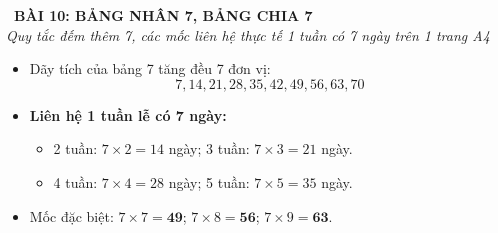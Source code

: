 \documentclass[12pt,a4paper]{article}
\begin{document}
\begin{tcolorbox}[
  enhanced,
  colback=teal!8!white,
  colframe=teal!70!black,
  arc=3mm, boxrule=1.2pt,
  left=3mm, right=3mm, top=2mm, bottom=2mm,
  halign=center
]
  {\LARGE\bfseries\color{teal!90!black}\faBookmark\ BÀI 10: BẢNG NHÂN 7, BẢNG CHIA 7}\\[1mm]
  {\itshape\footnotesize\color{black!75} Quy tắc đếm thêm 7, các mốc liên hệ thực tế 1 tuần có 7 ngày trên 1 trang A4}
\end{tcolorbox}

\vspace{-2mm}

\noindent
\begin{minipage}[t]{0.49\textwidth}\vspace{0pt}
\begin{tcolorbox}[
  enhanced,
  colback=blue!4!white,
  colframe=blue!75!black,
  arc=2mm, boxrule=0.8pt,
  left=2mm, right=2mm, top=1.8mm, bottom=1.8mm,
  title={\footnotesize\bfseries\color{white}\faTimes\ 1. Bảng nhân 7 (Đếm thêm 7)}
]
{\footnotesize
\begin{itemize}\setlength{\itemsep}{0.6pt}\setlength{\leftskip}{-2.5mm}
  \item Dãy tích của bảng 7 tăng đều 7 đơn vị:
  $$7, 14, 21, 28, 35, 42, 49, 56, 63, 70$$
  \item \textbf{Liên hệ 1 tuần lễ có 7 ngày:}
  \begin{itemize}\setlength{\itemsep}{0.5pt}\setlength{\leftskip}{-2.5mm}
    \item 2 tuần: $7 \times 2 = 14$ ngày; 3 tuần: $7 \times 3 = 21$ ngày.
    \item 4 tuần: $7 \times 4 = 28$ ngày; 5 tuần: $7 \times 5 = 35$ ngày.
  \end{itemize}
  \item Mốc đặc biệt: $7 \times 7 = \mathbf{49}$; $7 \times 8 = \mathbf{56}$; $7 \times 9 = \mathbf{63}$.
\end{itemize}
}
\end{tcolorbox}
\end{minipage}
\hfill
\end{document}

